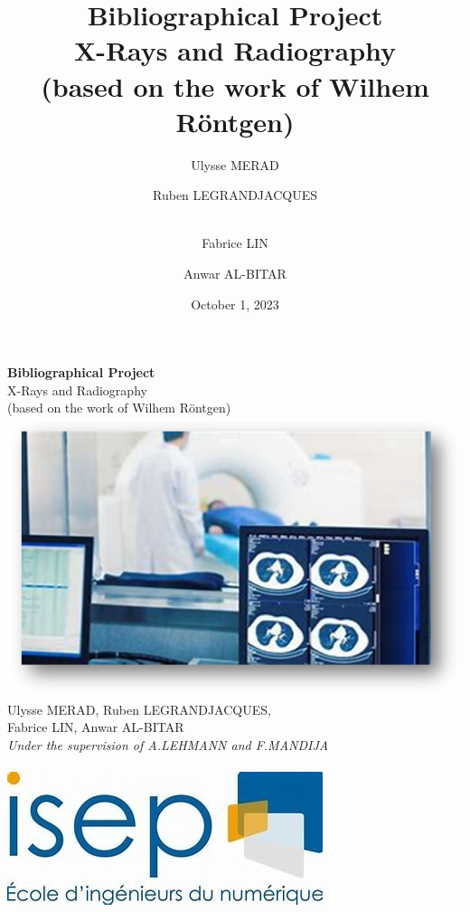 \documentclass[a4paper,12pt]{report}
\title{Bibliographical Project \\ [1ex]\large X-Rays and Radiography \\ (based on the work of Wilhem Röntgen)  }
\author{Ulysse MERAD\and Ruben LEGRANDJACQUES \and \\Fabrice LIN \and Anwar AL-BITAR}
\date{October 1, 2023}
\begin{document}
\begin{titlepage}
  \centering
  \vspace{3cm}
  \Huge{\textbf{Bibliographical Project}}\\
  \vspace{1cm}
  \Large{X-Rays and Radiography \\ (based on the work of Wilhem Röntgen)} \\
  \vspace{0.5cm}
  \includegraphics[scale=1]{xray.png}\\
  \vspace{0.5cm}
  Ulysse MERAD, Ruben LEGRANDJACQUES, \\ [0.5ex] Fabrice LIN, Anwar AL-BITAR \\
  \vspace{1.5cm}
  \large{\textit {Under the supervision of A.LEHMANN and F.MANDIJA}} \\
  \vspace{1.5cm}
  \thedate \\
  \vspace{2cm}
  \includegraphics[scale=0.6]{Isep.jpg}\\
  
\end{titlepage}



\newpage
\end{document}
